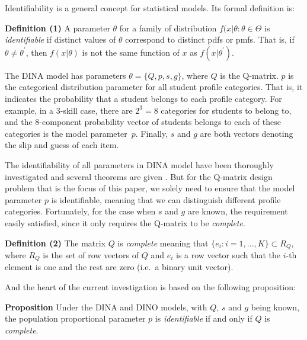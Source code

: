 \documentclass{edm_template}
\newcommand{\Michel}[1]{{\textcolor{purple}{[#1]}}}
\begin{document}
Identifiability is a general concept for statistical models. Its formal definition is:

\textbf{Definition (1)} \cite{casella2002statistical} A parameter $\theta$ for a family of distribution ${f(x|\theta: \theta \in \Theta}$ is \textit{identifiable} if distinct values of $\theta$ correspond to distinct pdfs or pmfs. That is, if $\theta \neq \theta^{\prime}$, then $f(x|\theta)$ is not the same function of $x$ as $f(x|\theta^{\prime})$.

The DINA model has parameters $\theta = \{Q, p, s, g\}$, where $Q$ is the Q-matrix. $p$ is the categorical distribution parameter for all student profile categories. That is, it indicates the probability that a student belongs to each profile category. For example, in a 3-skill case, there are $2^3=8$ categories for students to belong to, and the 8-component probability vector of students belongs to each of these categories is the model parameter~$p$. Finally, $s$ and $g$ are both vectors denoting the slip and guess of each item.


The identifiability of all parameters in DINA model have been thoroughly investigated and several theorems are given \cite{xu2015identifiability}. But for the Q-matrix design problem that is the focus of this paper, we solely need to ensure that the model parameter $p$ is identifiable, meaning that we can distinguish different profile categories. Fortunately, for the case when $s$ and $g$ are known, the requirement easily satisfied, since it only requires the Q-matrix to be \textit{complete}.

\textbf{Definition (2)} \cite{chen2015statistical}  The matrix $Q$ is \textit{complete} meaning that $\{e_{i}:i=1,...,K\} \subset R_{Q}$, where $R_{Q}$ is the set of row vectors of $Q$ and $e_{i}$ is a row vector such that the $i$-th element is one and the rest are zero (i.e.\ a binary unit vector).

And the heart of the current investigation is based on the following proposition:

\textbf{Proposition} \cite{chen2015statistical} Under the DINA and DINO models, with $Q$, $s$ and $g$ being known, the population proportional parameter $p$ is \textit{identifiable} if and only if $Q$ is \textit{complete}.

   
\end{document}
